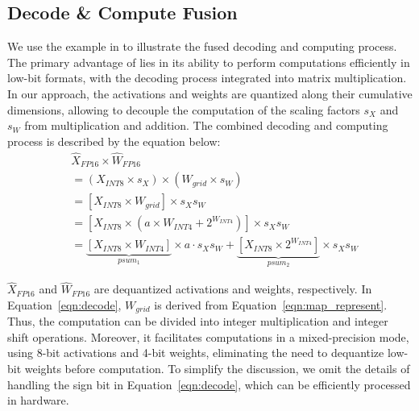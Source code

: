 \subsection{Decode \& Compute Fusion}
\label{sec:encode_decode}

We use the example in  to illustrate the fused decoding and computing process.
The primary advantage of \proj lies in its ability to perform computations efficiently in low-bit formats, with the decoding process integrated into matrix multiplication.
In our approach, the activations and weights are quantized along their cumulative dimensions, allowing to decouple the computation of the scaling factors $s_{X}$ and $s_{W}$ from multiplication and addition.
The combined decoding and computing process is described by the equation below:
\begin{equation}
    \begin{array}{ll}
    &\phantom{}\hat{X}_{FP16} \times \hat{W}_{FP16} \\
    &\phantom{}= (X_{INT8} \times s_{X}) \times (W_{grid} \times s_{W}) \\
    &\phantom{}= [X_{INT8} \times W_{grid}] \times s_{X} s_{W} \\
    &\phantom{}= [X_{INT8} \times (a \times W_{INT4} + 2^{W_{INT4}})] \times s_{X} s_{W} \\
    &\phantom{}= \underbrace{[X_{INT8} \times W_{INT4}]}_{\text{$psum_1$}} \times a \cdot s_{X} s_{W} + \underbrace{[X_{INT8} \times 2^{W_{INT4}}]}_{\text{$psum_2$}} \times s_{X} s_{W} 
    \end{array}
    \label{eqn:decode}
\end{equation}

$\hat{X}_{FP16}$ and $\hat{W}_{FP16}$ are dequantized activations and weights, respectively.
In Equation~\eqref{eqn:decode}, $W_{grid}$ is derived from Equation~\eqref{eqn:map_represent}.
Thus, the computation can be divided into integer multiplication and integer shift operations.
Moreover, it facilitates computations in a mixed-precision mode, using 8-bit activations and 4-bit weights, eliminating the need to dequantize low-bit weights before computation.    
To simplify the discussion, we omit the details of handling the sign bit in Equation~\eqref{eqn:decode}, which can be efficiently processed in hardware.


      
